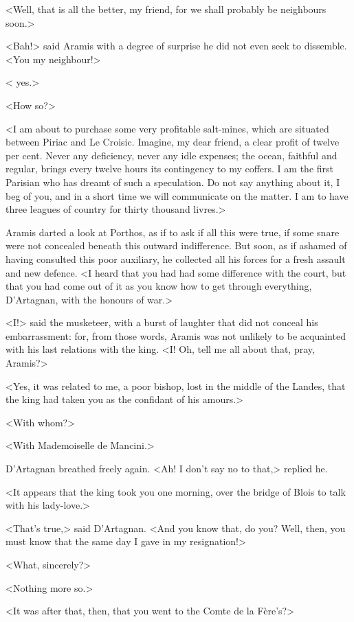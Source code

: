 <Well, that is all the better, my friend, for we shall probably be neighbours soon.>

<Bah!> said Aramis with a degree of surprise he did not even seek to dissemble. <You my neighbour!>

< yes.>

<How so?>

<I am about to purchase some very profitable salt-mines, which are situated between Piriac and Le Croisic. Imagine, my dear friend, a clear profit of twelve per cent. Never any deficiency, never any idle expenses; the ocean, faithful and regular, brings every twelve hours its contingency to my coffers. I am the first Parisian who has dreamt of such a speculation. Do not say anything about it, I beg of you, and in a short time we will communicate on the matter. I am to have three leagues of country for thirty thousand livres.>

Aramis darted a look at Porthos, as if to ask if all this were true, if some snare were not concealed beneath this outward indifference. But soon, as if ashamed of having consulted this poor auxiliary, he collected all his forces for a fresh assault and new defence. <I heard that you had had some difference with the court, but that you had come out of it as you know how to get through everything, D'Artagnan, with the honours of war.>

<I\@!> said the musketeer, with a burst of laughter that did not conceal his embarrassment: for, from those words, Aramis was not unlikely to be acquainted with his last relations with the king. <I\@! Oh, tell me all about that, pray, Aramis?>

<Yes, it was related to me, a poor bishop, lost in the middle of the Landes, that the king had taken you as the confidant of his amours.>

<With whom?>

<With Mademoiselle de Mancini.>

D'Artagnan breathed freely again. <Ah! I don't say no to that,> replied he.

<It appears that the king took you one morning, over the bridge of Blois to talk with his lady-love.>

<That's true,> said D'Artagnan. <And you know that, do you? Well, then, you must know that the same day I gave in my resignation!>

<What, sincerely?>

<Nothing more so.>

<It was after that, then, that you went to the Comte de la Fère's?>

